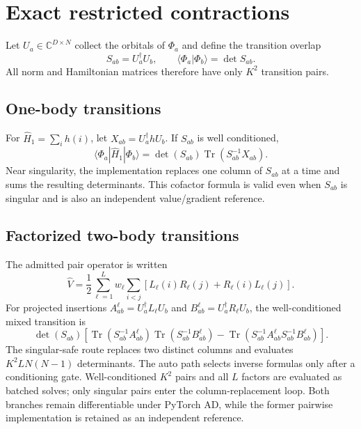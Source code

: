 \documentclass[11pt]{article}
\DeclareMathOperator{\Tr}{Tr}
\begin{document}
\section{Exact restricted contractions}

Let $U_a\in\mathbb C^{D\times N}$ collect the orbitals of $\Phi_a$ and define
the transition overlap
\begin{equation}
 S_{ab}=U_a^\dagger U_b,\qquad
 \langle\Phi_a|\Phi_b\rangle=\det S_{ab}.
 \label{eq:overlap}
\end{equation}
All norm and Hamiltonian matrices therefore have only $K^2$ transition pairs.

\subsection{One-body transitions}

For $\hat H_1=\sum_i h(i)$, let $X_{ab}=U_a^\dagger hU_b$.  If $S_{ab}$ is
well conditioned,
\begin{equation}
 \langle\Phi_a|\hat H_1|\Phi_b\rangle
 =\det(S_{ab})\Tr(S_{ab}^{-1}X_{ab}).
 \label{eq:one-body-transition}
\end{equation}
Near singularity, the implementation replaces one column of $S_{ab}$ at a
time and sums the resulting determinants.  This cofactor formula is valid even
when $S_{ab}$ is singular and is also an independent value/gradient reference.

\subsection{Factorized two-body transitions}

The admitted pair operator is written
\begin{equation}
 \hat V=\frac12\sum_{\ell=1}^{L}w_\ell\sum_{i<j}
 \left[L_\ell(i)R_\ell(j)+R_\ell(i)L_\ell(j)\right].
 \label{eq:factorized-pair}
\end{equation}
For projected insertions
$A_{ab}^{\ell}=U_a^\dagger L_\ell U_b$ and
$B_{ab}^{\ell}=U_a^\dagger R_\ell U_b$, the well-conditioned mixed transition is
\begin{equation}
 \det(S_{ab})\left[
 \Tr(S_{ab}^{-1}A_{ab}^{\ell})\Tr(S_{ab}^{-1}B_{ab}^{\ell})
 -\Tr(S_{ab}^{-1}A_{ab}^{\ell}S_{ab}^{-1}B_{ab}^{\ell})
 \right].
 \label{eq:two-body-transition}
\end{equation}
The singular-safe route replaces two distinct columns and evaluates
$K^2LN(N-1)$ determinants.  The auto path selects inverse formulas only after a
conditioning gate.  Well-conditioned $K^2$ pairs and all $L$ factors are
evaluated as batched solves; only singular pairs enter the column-replacement
loop.  Both branches remain differentiable under PyTorch AD, while the former
pairwise implementation is retained as an independent reference.
\end{document}
